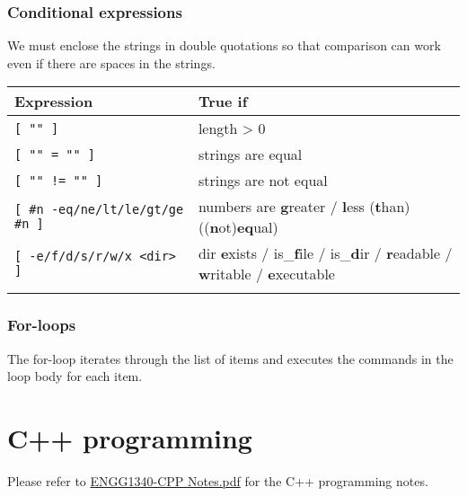\documentclass{article}
\begin{document}
\subsubsection{Conditional expressions}
We must enclose the strings in double quotations so that comparison can work even if there are spaces in the strings.
\begin{table}[H]
    \begin{tabular}{ll}
        \textbf{Expression}                      & \textbf{True if}                                                                                       \\ \hline
        \lstinline|[ "" ]|                       & length > 0                                                                                             \\ \arrayrulecolor{lightgray}\hline
        \lstinline|[ "" = "" ]|                  & strings are equal                                                                                      \\ \arrayrulecolor{lightgray}\hline
        \lstinline|[ "" != "" ]|                 & strings are not equal                                                                                  \\ \arrayrulecolor{lightgray}\hline
        \lstinline|[ #n -eq/ne/lt/le/gt/ge #n ]| & numbers are {\bf g}reater / {\bf l}ess ({\bf t}han) (({\bf n}ot){\bf eq}ual)                           \\ \arrayrulecolor{lightgray}\hline
        \lstinline|[ -e/f/d/s/r/w/x <dir> ]|     & dir {\bf e}xists / is\_{\bf f}ile / is\_{\bf d}ir / {\bf r}eadable / {\bf w}ritable / {\bf e}xecutable \\ \arrayrulecolor{lightgray}\hline
    \end{tabular}
\end{table}

\subsubsection{For-loops}
The for-loop iterates through the list of items and executes the commands in the loop body for each item.



\section{C++ programming}
Please refer to \href{https://jaxtam.dev/notes}{ENGG1340-CPP Notes.pdf} for the C++ programming notes.
\end{document}
